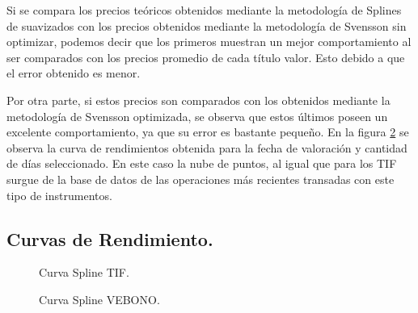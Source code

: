 \hspace{0.4cm} Si se compara los precios te\'oricos obtenidos mediante la metodolog\'ia de Splines de suavizados con los precios obtenidos mediante la metodolog\'ia de Svensson sin optimizar, podemos decir que los primeros muestran un mejor comportamiento al ser comparados con los precios promedio de cada t\'itulo valor. Esto debido a que el error obtenido es menor.

\hspace{0.4cm}Por otra parte, si estos precios son comparados con los obtenidos mediante la metodolog\'ia de Svensson optimizada, se observa que estos \'ultimos poseen un excelente comportamiento, ya que su error es bastante peque\~no. En la figura \ref{curva_spline_veb} se observa la curva de rendimientos obtenida para la fecha de valoraci\'on y cantidad de d\'ias seleccionado. En este caso la nube de puntos, al igual que para los TIF surgue de la base de datos de las operaciones m\'as recientes transadas con este tipo de instrumentos.

\subsection{Curvas de Rendimiento.} \hspace{5cm}


\begin{figure}[h]
\caption{Curva Spline TIF.}
\label{curva_spline_tif}
\end{figure}


\begin{figure}[h]
\caption{Curva Spline VEBONO.}
\label{curva_spline_veb}
\end{figure}

